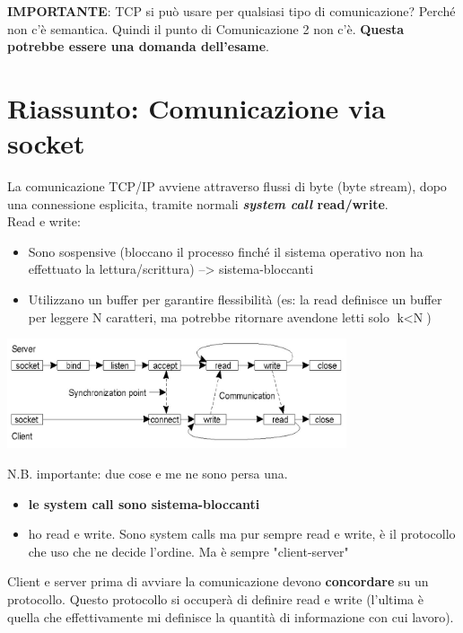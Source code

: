 \textbf{IMPORTANTE}: TCP si può usare per qualsiasi tipo di comunicazione? Perché non c'è semantica. Quindi il punto di Comunicazione 2 non c'è. \textbf{Questa potrebbe essere una domanda dell'esame}.

\section{Riassunto: Comunicazione via socket}
La comunicazione TCP/IP avviene attraverso flussi di byte (byte stream), dopo una connessione esplicita, tramite normali \textbf{\textit{system call} read/write}.
\\Read e write:
\begin{itemize}
    \item Sono sospensive (bloccano il processo finché il sistema operativo non ha effettuato la lettura/scrittura) --> sistema-bloccanti
    \item Utilizzano un buffer per garantire flessibilità (es: la read definisce un buffer per leggere N caratteri, ma potrebbe ritornare avendone letti solo $\text{k}<\text{N}$)
\end{itemize}
\begin{center}
    \includegraphics[width=0.75\textwidth]{img/socket_comunicazione1.jpg}
\end{center}
N.B. importante: due cose e me ne sono persa una.
\begin{itemize}
    \item \textbf{le system call sono sistema-bloccanti}
    \item ho read e write. Sono system calls ma pur sempre read e write, è il protocollo che uso che ne decide l'ordine. Ma è sempre "client-server"
\end{itemize}
Client e server prima di avviare la comunicazione devono \textbf{concordare} su un protocollo. Questo protocollo si occuperà di definire read e write (l'ultima è quella che effettivamente mi definisce la quantità di informazione con cui lavoro). 

